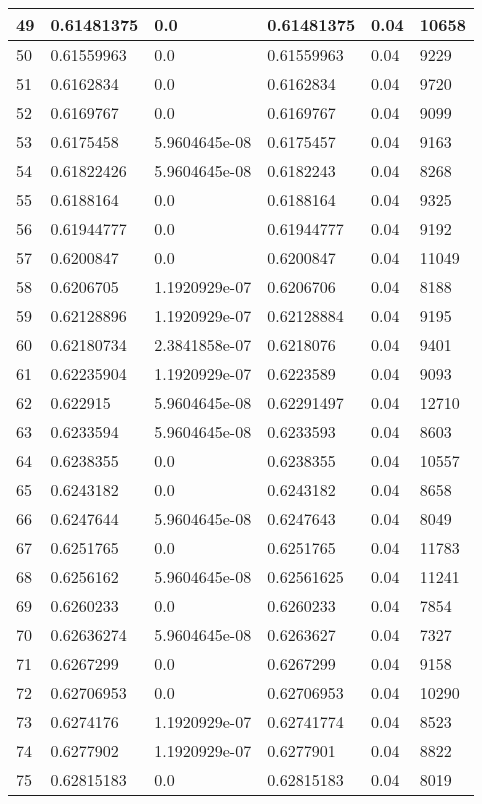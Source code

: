 \begin{longtable}{|l|l|l|l|l|l|}
49 & 0.61481375 & 0.0 & 0.61481375 & 0.04 & 10658 \\ \hline 
50 & 0.61559963 & 0.0 & 0.61559963 & 0.04 & 9229 \\ \hline 
51 & 0.6162834 & 0.0 & 0.6162834 & 0.04 & 9720 \\ \hline 
52 & 0.6169767 & 0.0 & 0.6169767 & 0.04 & 9099 \\ \hline 
53 & 0.6175458 & 5.9604645e-08 & 0.6175457 & 0.04 & 9163 \\ \hline 
54 & 0.61822426 & 5.9604645e-08 & 0.6182243 & 0.04 & 8268 \\ \hline 
55 & 0.6188164 & 0.0 & 0.6188164 & 0.04 & 9325 \\ \hline 
56 & 0.61944777 & 0.0 & 0.61944777 & 0.04 & 9192 \\ \hline 
57 & 0.6200847 & 0.0 & 0.6200847 & 0.04 & 11049 \\ \hline 
58 & 0.6206705 & 1.1920929e-07 & 0.6206706 & 0.04 & 8188 \\ \hline 
59 & 0.62128896 & 1.1920929e-07 & 0.62128884 & 0.04 & 9195 \\ \hline 
60 & 0.62180734 & 2.3841858e-07 & 0.6218076 & 0.04 & 9401 \\ \hline 
61 & 0.62235904 & 1.1920929e-07 & 0.6223589 & 0.04 & 9093 \\ \hline 
62 & 0.622915 & 5.9604645e-08 & 0.62291497 & 0.04 & 12710 \\ \hline 
63 & 0.6233594 & 5.9604645e-08 & 0.6233593 & 0.04 & 8603 \\ \hline 
64 & 0.6238355 & 0.0 & 0.6238355 & 0.04 & 10557 \\ \hline 
65 & 0.6243182 & 0.0 & 0.6243182 & 0.04 & 8658 \\ \hline 
66 & 0.6247644 & 5.9604645e-08 & 0.6247643 & 0.04 & 8049 \\ \hline 
67 & 0.6251765 & 0.0 & 0.6251765 & 0.04 & 11783 \\ \hline 
68 & 0.6256162 & 5.9604645e-08 & 0.62561625 & 0.04 & 11241 \\ \hline 
69 & 0.6260233 & 0.0 & 0.6260233 & 0.04 & 7854 \\ \hline 
70 & 0.62636274 & 5.9604645e-08 & 0.6263627 & 0.04 & 7327 \\ \hline 
71 & 0.6267299 & 0.0 & 0.6267299 & 0.04 & 9158 \\ \hline 
72 & 0.62706953 & 0.0 & 0.62706953 & 0.04 & 10290 \\ \hline 
73 & 0.6274176 & 1.1920929e-07 & 0.62741774 & 0.04 & 8523 \\ \hline 
74 & 0.6277902 & 1.1920929e-07 & 0.6277901 & 0.04 & 8822 \\ \hline 
75 & 0.62815183 & 0.0 & 0.62815183 & 0.04 & 8019 \\ \hline 
\end{longtable}